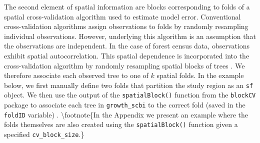 \documentclass[12pt]{article}
\begin{document}
The second element of spatial information are blocks corresponding to
folds of a spatial cross-validation algorithm used to estimate model
error. Conventional cross-validation algorithms assign observations to
folds by randomly resampling individual observations. However,
underlying this algorithm is an assumption that the observations are
independent. In the case of forest census data, observations exhibit
spatial autocorrelation. This spatial dependence is incorporated into
the cross-validation algorithm by randomly resampling spatial blocks of
trees \citet{roberts_cross-validation_2017}
\citet{pohjankukka_estimating_2017}. We therefore associate each
observed tree to one of \(k\) spatial folds. In the example below, we
first manually define two folds that partition the study region as an
\texttt{sf} object. We then use the output of the
\texttt{spatialBlock()} function from the \texttt{blockCV} package to
associate each tree in \texttt{growth\_scbi} to the correct fold (saved
in the \texttt{foldID} variable) \citet{valavi_blockcv_2019}.
\textbackslash footnote\{In the Appendix we present an example where the
folds themselves are also created using the \texttt{spatialBlock()}
function given a specified \texttt{cv\_block\_size}.\}
\end{document}
